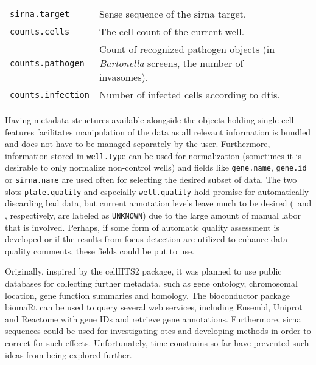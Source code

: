 \begin{table}
\begin{tabular}{L{0.25\linewidth}L{0.7\linewidth}}
    \texttt{sirna.target} &
      Sense sequence of the \gls{sirna} target. \\
    \texttt{counts.cells} &
      The cell count of the current well. \\
    \texttt{counts.pathogen} &
      Count of recognized pathogen objects (in \textit{Bartonella} screens, the number of invasomes). \\
    \texttt{counts.infection} &
      Number of infected cells according to \gls{dtis}. \\
    \hline 
  \end{tabular}
\end{table}

Having metadata structures available alongside the objects holding single cell features facilitates manipulation of the data as all relevant information is bundled and does not have to be managed separately by the user. Furthermore, information stored in \texttt{well.type} can be used for normalization (sometimes it is desirable to only normalize non-control wells) and fields like \texttt{gene.name}, \texttt{gene.id} or \texttt{sirna.name} are used often for selecting the desired subset of data. The two slots \texttt{plate.quality} and especially \texttt{well.quality} hold promise for automatically discarding bad data, but current annotation levels leave much to be desired (\knitrScfMetadatPlateQualityFrac\ and \knitrScfMetadatWellQualityFrac, respectively, are labeled as \texttt{UNKNOWN}) due to the large amount of manual labor that is involved. Perhaps, if some form of automatic quality assessment is developed or if the results from focus detection are utilized to enhance data quality comments, these fields could be put to use.

Originally, inspired by the cellHTS2 package, it was planned to use public databases for collecting further metadata, such as gene ontology, chromosomal location, gene function summaries and homology. The bioconductor package biomaRt \citep{Durinck2005,Durinck2009} can be used to query several web services, including Ensembl, Uniprot and Reactome with gene IDs \citep{Maglott2011} and retrieve gene annotations. Furthermore, \gls{sirna} sequences could be used for investigating \glspl{ote} and developing methods in order to correct for such effects. Unfortunately, time constrains so far have prevented such ideas from being explored further.

